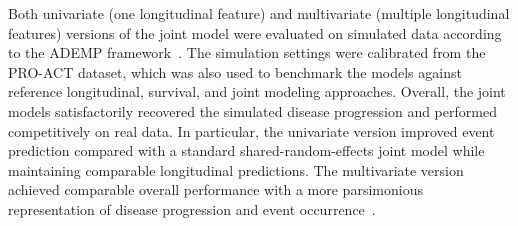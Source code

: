 \documentclass{rapportCS}
\begin{document}


Both univariate (one longitudinal feature) and multivariate (multiple longitudinal features) versions of the joint model were evaluated on simulated data according to the ADEMP framework~\cite{morris2019using}. The simulation settings were calibrated from the PRO-ACT dataset, which was also used to benchmark the models against reference longitudinal, survival, and joint modeling approaches. Overall, the joint models satisfactorily recovered the simulated disease progression and performed competitively on real data. In particular, the univariate version improved event prediction compared with a standard shared-random-effects joint model while maintaining comparable longitudinal predictions. The multivariate version achieved comparable overall performance with a more parsimonious representation of disease progression and event occurrence~\cite{ortholand2025multijoint, ortholand2026joint}. 
\end{document}
